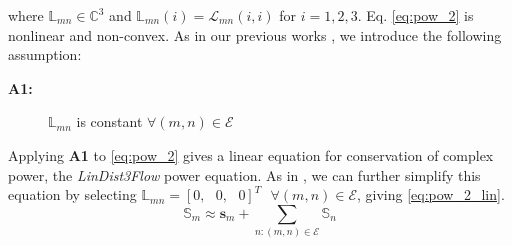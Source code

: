 \noindent where $\mathbb{L}_{mn} \in \mathbb{C}^{3}$ and $\mathbb{L}_{mn}(i) = \mathcal L_{mn}(i,i)$ for $i = 1,2,3$. Eq. \eqref{eq:pow_2} is nonlinear and non-convex.  As in our previous works \cite{arnold2015optimal}, \cite{sankur2016linear} we introduce the following assumption:
\begin{description}
    \item[\textbf{A1:} ] $\mathbb{L}_{mn}$ is constant $\forall (m,n) \in \mathcal{E}$
\end{description}

\noindent Applying \textbf{A1} to \eqref{eq:pow_2} gives a linear equation for conservation of complex power, the \emph{LinDist3Flow} power equation. As in \cite{baran1989optimal}, we can further simplify this equation by selecting $\mathbb{L}_{mn} = {\left[0, \text{ } 0, \text{ } 0 \right]}^{T} \text{ } \forall (m,n) \in \mathcal{E}$, giving \eqref{eq:pow_2_lin}.
\begin{equation}
	\mathbb{S}_{m} \approx \mathbf{s}_{m} + \sum_{n:(m,n) \in \mathcal{E}} \mathbb{S}_{n}
    \label{eq:pow_2_lin}
\end{equation}